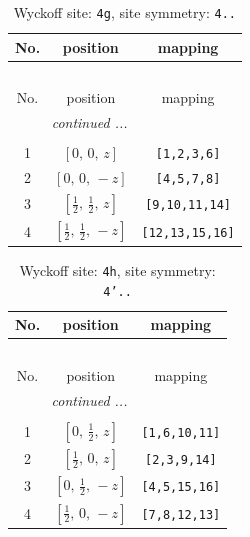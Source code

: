 \documentclass[fleqn,8pt]{jsarticle}
\begin{document}
\renewcommand{\arraystretch}{1.2}
\begin{longtable}{ccc}
\caption{Wyckoff site: {\tt 4g}, site symmetry: {\tt 4..}}
 \\
 \hline \hline
No. & position & mapping \\ \hline \endfirsthead

\multicolumn{2}{l}{\tablename\ \thetable{}} \\
 \hline \hline
No. & position & mapping \\ \hline \endhead

 \hline \hline
\multicolumn{2}{r}{\footnotesize\it continued ...} \\ \endfoot

 \hline \hline
\multicolumn{2}{r}{} \\ \endlastfoot

1 & $\left[ 0,\, 0,\, z \right]$ & {\tt [1,2,3,6]} \\ \hline
2 & $\left[ 0,\, 0,\, - z \right]$ & {\tt [4,5,7,8]} \\ \hline
3 & $\left[ \frac{1}{2},\, \frac{1}{2},\, z \right]$ & {\tt [9,10,11,14]} \\ \hline
4 & $\left[ \frac{1}{2},\, \frac{1}{2},\, - z \right]$ & {\tt [12,13,15,16]} \\
\end{longtable}
\renewcommand{\arraystretch}{1.2}
\begin{longtable}{ccc}
\caption{Wyckoff site: {\tt 4h}, site symmetry: {\tt 4'..}}
 \\
 \hline \hline
No. & position & mapping \\ \hline \endfirsthead

\multicolumn{2}{l}{\tablename\ \thetable{}} \\
 \hline \hline
No. & position & mapping \\ \hline \endhead

 \hline \hline
\multicolumn{2}{r}{\footnotesize\it continued ...} \\ \endfoot

 \hline \hline
\multicolumn{2}{r}{} \\ \endlastfoot

1 & $\left[ 0,\, \frac{1}{2},\, z \right]$ & {\tt [1,6,10,11]} \\ \hline
2 & $\left[ \frac{1}{2},\, 0,\, z \right]$ & {\tt [2,3,9,14]} \\ \hline
3 & $\left[ 0,\, \frac{1}{2},\, - z \right]$ & {\tt [4,5,15,16]} \\ \hline
4 & $\left[ \frac{1}{2},\, 0,\, - z \right]$ & {\tt [7,8,12,13]} \\
\end{longtable}
\end{document}
